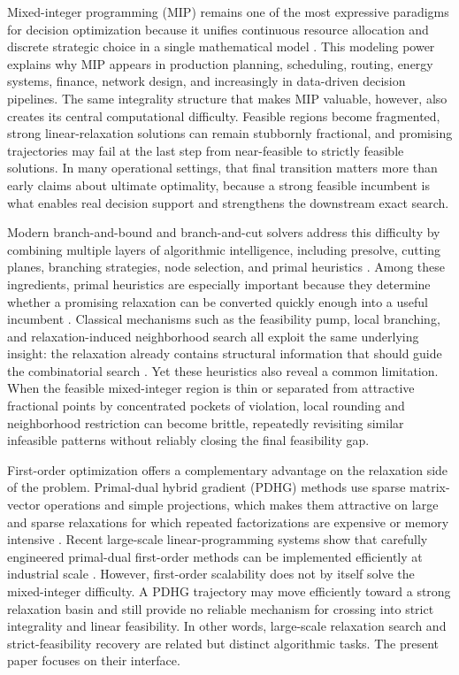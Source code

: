 Mixed-integer programming (MIP) remains one of the most expressive paradigms for decision optimization because it unifies continuous resource allocation and discrete strategic choice in a single mathematical model \cite{bertsimas2005optimization,morrison2016branch}. This modeling power explains why MIP appears in production planning, scheduling, routing, energy systems, finance, network design, and increasingly in data-driven decision pipelines. The same integrality structure that makes MIP valuable, however, also creates its central computational difficulty. Feasible regions become fragmented, strong linear-relaxation solutions can remain stubbornly fractional, and promising trajectories may fail at the last step from near-feasible to strictly feasible solutions. In many operational settings, that final transition matters more than early claims about ultimate optimality, because a strong feasible incumbent is what enables real decision support and strengthens the downstream exact search.

Modern branch-and-bound and branch-and-cut solvers address this difficulty by combining multiple layers of algorithmic intelligence, including presolve, cutting planes, branching strategies, node selection, and primal heuristics \cite{achterberg2009constraint,gleixner2021miplib}. Among these ingredients, primal heuristics are especially important because they determine whether a promising relaxation can be converted quickly enough into a useful incumbent \cite{berthold2013measuring}. Classical mechanisms such as the feasibility pump, local branching, and relaxation-induced neighborhood search all exploit the same underlying insight: the relaxation already contains structural information that should guide the combinatorial search \cite{fischetti2005feasibility,fischetti2003local,danna2005exploring}. Yet these heuristics also reveal a common limitation. When the feasible mixed-integer region is thin or separated from attractive fractional points by concentrated pockets of violation, local rounding and neighborhood restriction can become brittle, repeatedly revisiting similar infeasible patterns without reliably closing the final feasibility gap.

First-order optimization offers a complementary advantage on the relaxation side of the problem. Primal-dual hybrid gradient (PDHG) methods use sparse matrix-vector operations and simple projections, which makes them attractive on large and sparse relaxations for which repeated factorizations are expensive or memory intensive \cite{chambolle2011first,applegate2021practical,lu2023cupdlp}. Recent large-scale linear-programming systems show that carefully engineered primal-dual first-order methods can be implemented efficiently at industrial scale \cite{applegate2021practical,lu2023cupdlp}. However, first-order scalability does not by itself solve the mixed-integer difficulty. A PDHG trajectory may move efficiently toward a strong relaxation basin and still provide no reliable mechanism for crossing into strict integrality and linear feasibility. In other words, large-scale relaxation search and strict-feasibility recovery are related but distinct algorithmic tasks. The present paper focuses on their interface.


